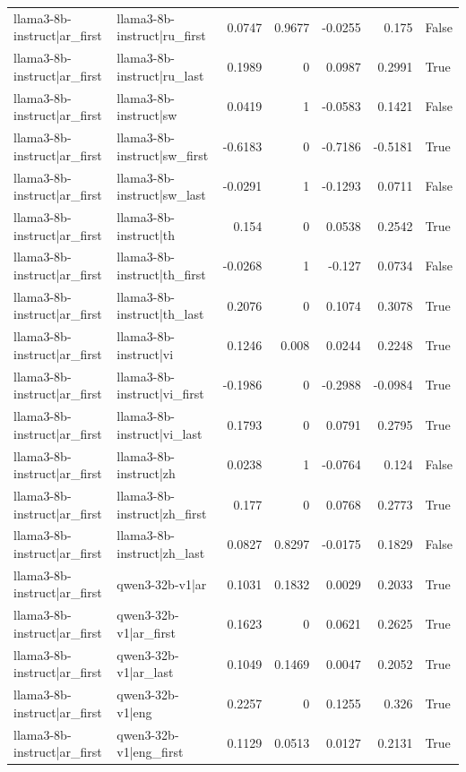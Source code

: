 \begin{table}
\begin{tabular}{l l r r r r l}
llama3-8b-instruct|ar_first & llama3-8b-instruct|ru_first & 0.0747 & 0.9677 & -0.0255 & 0.175 & False \\
llama3-8b-instruct|ar_first & llama3-8b-instruct|ru_last & 0.1989 & 0 & 0.0987 & 0.2991 & True \\
llama3-8b-instruct|ar_first & llama3-8b-instruct|sw & 0.0419 & 1 & -0.0583 & 0.1421 & False \\
llama3-8b-instruct|ar_first & llama3-8b-instruct|sw_first & -0.6183 & 0 & -0.7186 & -0.5181 & True \\
llama3-8b-instruct|ar_first & llama3-8b-instruct|sw_last & -0.0291 & 1 & -0.1293 & 0.0711 & False \\
llama3-8b-instruct|ar_first & llama3-8b-instruct|th & 0.154 & 0 & 0.0538 & 0.2542 & True \\
llama3-8b-instruct|ar_first & llama3-8b-instruct|th_first & -0.0268 & 1 & -0.127 & 0.0734 & False \\
llama3-8b-instruct|ar_first & llama3-8b-instruct|th_last & 0.2076 & 0 & 0.1074 & 0.3078 & True \\
llama3-8b-instruct|ar_first & llama3-8b-instruct|vi & 0.1246 & 0.008 & 0.0244 & 0.2248 & True \\
llama3-8b-instruct|ar_first & llama3-8b-instruct|vi_first & -0.1986 & 0 & -0.2988 & -0.0984 & True \\
llama3-8b-instruct|ar_first & llama3-8b-instruct|vi_last & 0.1793 & 0 & 0.0791 & 0.2795 & True \\
llama3-8b-instruct|ar_first & llama3-8b-instruct|zh & 0.0238 & 1 & -0.0764 & 0.124 & False \\
llama3-8b-instruct|ar_first & llama3-8b-instruct|zh_first & 0.177 & 0 & 0.0768 & 0.2773 & True \\
llama3-8b-instruct|ar_first & llama3-8b-instruct|zh_last & 0.0827 & 0.8297 & -0.0175 & 0.1829 & False \\
llama3-8b-instruct|ar_first & qwen3-32b-v1|ar & 0.1031 & 0.1832 & 0.0029 & 0.2033 & True \\
llama3-8b-instruct|ar_first & qwen3-32b-v1|ar_first & 0.1623 & 0 & 0.0621 & 0.2625 & True \\
llama3-8b-instruct|ar_first & qwen3-32b-v1|ar_last & 0.1049 & 0.1469 & 0.0047 & 0.2052 & True \\
llama3-8b-instruct|ar_first & qwen3-32b-v1|eng & 0.2257 & 0 & 0.1255 & 0.326 & True \\
llama3-8b-instruct|ar_first & qwen3-32b-v1|eng_first & 0.1129 & 0.0513 & 0.0127 & 0.2131 & True \\

\end{tabular}
\end{table}
